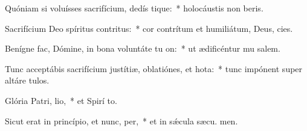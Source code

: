 \item Quóniam si voluísses sacrifícium, dedís tique:~* holocáustis non beris.
\item Sacrifícium Deo spíritus contritus:~* cor contrítum et humiliátum, Deus,  cies.
\item Benígne fac, Dómine, in bona voluntáte tu on:~* ut ædificéntur mu salem.
\item Tunc acceptábis sacrifícium justítiæ, oblatiónes, et hota:~* tunc impónent super altáre  tulos.
\item Glória Patri,  lio,~* et Spirí to.
\item Sicut erat in princípio, et nunc,  per,~* et in sǽcula sæcu. men.
